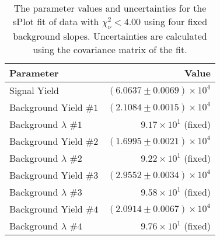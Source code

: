 
\begin{table}[ht]
    \begin{center}
        \begin{tabular}{lr}\toprule
            Parameter & Value \\\midrule
            Signal Yield & $(6.0637 \pm 0.0069) \times 10^{4}$ \\
            Background Yield $\#1$ & $(2.1084 \pm 0.0015) \times 10^{4}$ \\
            Background $\lambda$ $\#1$ & $9.17 \times 10^{1}$ (fixed) \\
            Background Yield $\#2$ & $(1.6995 \pm 0.0021) \times 10^{4}$ \\
            Background $\lambda$ $\#2$ & $9.22 \times 10^{1}$ (fixed) \\
            Background Yield $\#3$ & $(2.9552 \pm 0.0034) \times 10^{4}$ \\
            Background $\lambda$ $\#3$ & $9.58 \times 10^{1}$ (fixed) \\
            Background Yield $\#4$ & $(2.0914 \pm 0.0067) \times 10^{4}$ \\
            Background $\lambda$ $\#4$ & $9.76 \times 10^{1}$ (fixed) \\\bottomrule
        \end{tabular}
        \caption{The parameter values and uncertainties for the sPlot fit of data with $\chi^2_\nu < 4.00$ using four fixed background slopes. Uncertainties are calculated using the covariance matrix of the fit.}\label{tab:splot-fit-results-chisqdof-4.00-fixed-4}
    \end{center}
\end{table}

